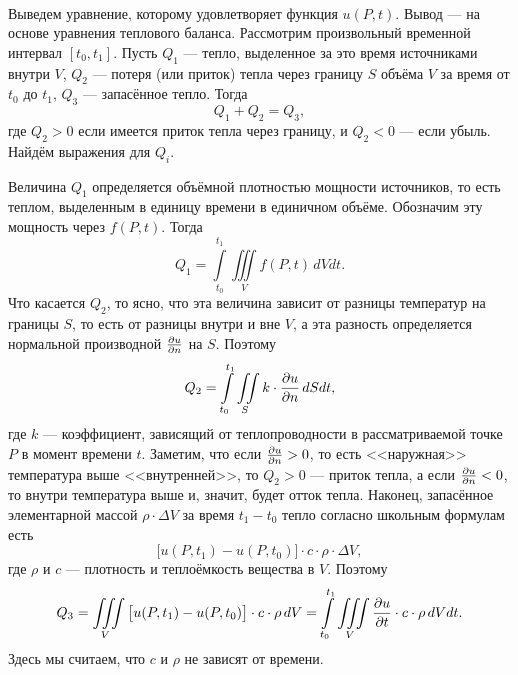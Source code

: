 \begin{figure}[H]
	\caption{~}
\label{l18:fig:1}
\end{figure}

Выведем уравнение, которому удовлетворяет функция $u(P,t)$. Вывод --- на основе уравнения теплового баланса. Рассмотрим произвольный временной интервал $[t_0,t_1]$. Пусть $Q_1$ --- тепло, выделенное за это время источниками внутри $V$, $Q_2$ --- потеря (или приток) тепла через границу $S$ объёма $V$ за время от $t_0$ до $t_1$, $Q_3$ --- запасённое тепло. Тогда 
\begin{equation}\label{l18:eq:16}
	 Q_1+Q_2=Q_3,
\end{equation}
где $Q_2>0$ если имеется приток тепла через границу, и $Q_2<0$ --- если убыль. Найдём выражения для $Q_i$.

Величина $Q_1$ определяется объёмной плотностью мощности источников, то есть теплом, выделенным в единицу времени в единичном объёме. Обозначим эту мощность через $f(P,t)$. Тогда 
\begin{equation}\label{l18:eq:17}
	 Q_1=\int\limits_{t_0}^{t_1}\iiint\limits_{V} f(P,t)\,dVdt. 
\end{equation}
Что касается $Q_2$, то ясно, что эта величина зависит от разницы температур на границы $S$, то есть от разницы внутри и вне $V$, а эта разность определяется нормальной производной $\frac{\partial u}{\partial n}$ на $S$. Поэтому
\begin{equation}\label{l18:eq:18}
	 Q_2=\int\limits_{t_0}^{t_1}\iint\limits_{S} k\cdot\frac{\partial u}{\partial n}\,dSdt, 
\end{equation}
где $k$ --- коэффициент, зависящий от теплопроводности в рассматриваемой точке $P$ в момент времени $t$. Заметим, что если $\frac{\partial u}{\partial n}>0$, то есть <<наружная>> температура выше <<внутренней>>, то $Q_2>0$ --- приток тепла, а если $\frac{\partial u}{\partial n}<0$, то внутри температура выше и, значит, будет отток тепла. Наконец, запасённое элементарной массой $\rho\cdot\Delta V$ за время $t_1-t_0$ тепло согласно школьным формулам есть
\begin{equation*}
	 \big[u(P,t_1)-u(P,t_0)\big]\cdot c\cdot\rho\cdot\Delta V,
\end{equation*} 
где $\rho$ и $c$ --- плотность и теплоёмкость вещества в $V$. Поэтому 
\begin{equation}\label{l18:eq:19}
	 Q_3=\iiint\limits_{V}\big[u(P,t_1)-u(P,t_0)\big]\cdot c\cdot\rho\,dV=\int\limits_{t_0}^{t_1}\iiint\limits_{V}\frac{\partial u}{\partial t}\cdot c\cdot\rho\,dVdt.
\end{equation}
Здесь мы считаем, что $c$ и $\rho$ не зависят от времени. 

